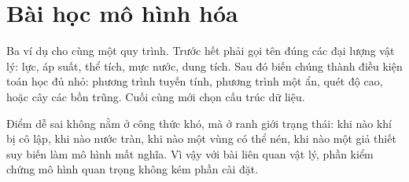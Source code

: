 \documentclass[11pt]{article}
\begin{document}
\section{Bài học mô hình hóa}

Ba ví dụ cho cùng một quy trình. Trước hết phải gọi tên đúng các đại lượng vật
lý: lực, áp suất, thể tích, mực nước, dung tích. Sau đó biến chúng thành điều
kiện toán học đủ nhỏ: phương trình tuyến tính, phương trình một ẩn, quét độ
cao, hoặc cây các bồn trũng. Cuối cùng mới chọn cấu trúc dữ liệu.

Điểm dễ sai không nằm ở công thức khó, mà ở ranh giới trạng thái: khi nào khí
bị cô lập, khi nào nước tràn, khi nào một vùng có thể nén, khi nào một giả
thiết suy biến làm mô hình mất nghĩa. Vì vậy với bài liên quan vật lý, phần
kiểm chứng mô hình quan trọng không kém phần cài đặt.
\end{document}
